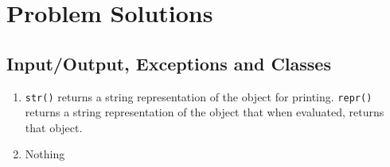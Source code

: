 \chapter{Problem Solutions}

\section{Input/Output, Exceptions and Classes}

\begin{enumerate}
	\item \verb|str()| returns a string representation of the object for printing. \verb|repr()| returns a string representation of the object that when evaluated, returns that object.
	\item Nothing
\end{enumerate}